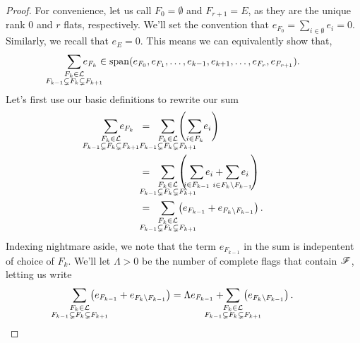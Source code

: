 \documentclass[12pt,oneside]{../../sfsuthesis}
\begin{document}
\begin{proof}
    For convenience, let us call \( F_0 = \emptyset \) and \( F_{r+1} = E \), as they are the unique rank 0 and \( r \) flats, respectively.
    We'll set the convention that \( e_{F_0} = \sum_{i \in \emptyset} e_i = 0 \).
    Similarly, we recall that \( e_E = 0 \).
    This means we can equivalently show that,
    \[
        \sum_{\mathclap{\substack{F_k \in \cL \\ F_{k-1} \subsetneq F_k \subsetneq F_{k+1} }}} e_{F_{k}} \in \Span( e_{F_0}, e_{F_1}, \dots, e_{k-1}, e_{k+1}, \dots, e_{F_r}, e_{F_{r+1}} ).
    \]
    Let's first use our basic definitions to rewrite our sum
    \begin{align*}
        \sum_{\mathclap{\substack{F_k \in \cL \\ F_{k-1} \subsetneq F_k \subsetneq F_{k+1} }}} e_{F_{k}}
        \;\; & = \;\;\;
        \sum_{\mathclap{\substack{F_k \in \cL \\ F_{k-1} \subsetneq F_k \subsetneq F_{k+1} }}}\, \left( \, \sum_{\mathclap{ i \in F_k }}e_i \right) \\
             & = \;\;\;
        \sum_{\mathclap{\substack{F_k \in \cL \\ F_{k-1} \subsetneq F_k \subsetneq F_{k+1} }}}\, \left( \; \sum_{\mathclap{ i \in F_{k-1} }}e_i + \sum_{\mathclap{ i \in F_{k} \setminus F_{k-1} }}e_i \, \right) \\
             & = \;\;\;
        \sum_{\mathclap{\substack{F_k \in \cL \\ F_{k-1} \subsetneq F_k \subsetneq F_{k+1} }}}\, \left( e_{F_{k-1}} + e_{F_k \setminus F_{k-1}} \right).
    \end{align*}
    Indexing nightmare aside, we note that the term \( e_{F_{k-1}}\) in the sum is indepentent of choice of \( F_k \).
    We'll let \( \Lambda > 0 \) be the number of complete flags that contain \( \mathscr{F} \), letting us write
    \[
        \sum_{\mathclap{\substack{F_k \in \cL \\ F_{k-1} \subsetneq F_k \subsetneq F_{k+1} }}}\, \left( e_{F_{k-1}} + e_{F_k \setminus F_{k-1}} \right)
        = \Lambda e_{F_{k-1}} + \sum_{\mathclap{\substack{F_k \in \cL \\ F_{k-1} \subsetneq F_k \subsetneq F_{k+1} }}}\, \left( e_{F_k \setminus F_{k-1}} \right).
    \]


\end{proof}
\end{document}
